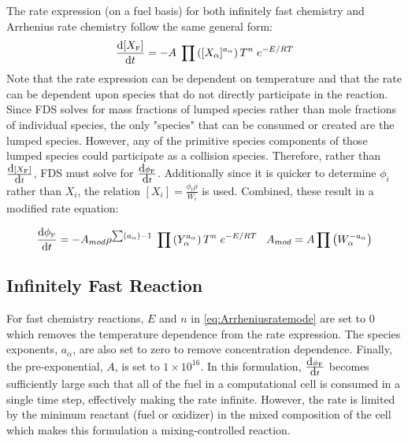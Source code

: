 \label{Reaction_Rate_Model}

The rate expression (on a fuel basis) for both infinitely fast chemistry and Arrhenius rate chemistry follow the same general form:
\begin{equation}\label{eq:Arrheniusrateeqn}
\frac{\mbox{d}[X_{\tiny \hbox{F}}]}{\mbox{d}t} = -A \; \prod \left([X_{\alpha}]^{a_{\alpha}} \right) T^n \; e^{-E/RT} 
\end{equation}
Note that the rate expression can be dependent on temperature and that the rate can be dependent upon species that do not directly participate in the reaction. Since FDS solves for mass fractions of lumped species rather than mole fractions of individual species, the only "species" that can be consumed or created are the lumped species.  However, any of the primitive species components of those lumped species could participate as a collision species.  Therefore, rather than $\frac{\mbox{d}[X_{\tiny \hbox{F}}]}{\mbox{d}t}$,  FDS must solve for $\frac{\mbox{d}\phi_{\tiny \hbox{F}}}{\mbox{d}t}$.  Additionally since it is quicker to determine $\phi_i$ rather than $X_i$, the relation $[X_i]=\frac{\phi_i \rho}{W_i}$ is used.  Combined, these result in a modified rate equation:

\begin{equation}\label{eq:Arrheniusratemode}
\frac{\mbox{d}\phi_{\tiny \hbox{F}}}{\mbox{d}t} = -A_{mod} \rho^{\sum (a_{\alpha}) -1} \; \prod \left(Y_{\alpha}^{a_{\alpha}} \right) T^n \; e^{-E/RT} \;\;\; A_{mod} = A \prod \left(W_{\alpha}^{-a_{\alpha}} \right)  
\end{equation}

\subsection{Infinitely Fast Reaction}
For fast chemistry reactions, $E$ and $n$ in \ref{eq:Arrheniusratemode} are set to $0$ which removes the temperature dependence from the rate expression. The species exponents, $a_{\alpha}$, are also set to zero to remove concentration dependence. Finally, the pre-exponential, $A$, is set to $1 \times 10^{16}$. In this formulation, $\frac{\mbox{d}\phi_{\tiny \hbox{F}}}{\mbox{d}t}$ becomes sufficiently large such that all of the fuel in a computational cell is consumed in a single time step, effectively making the rate infinite. However, the rate is limited by the minimum reactant (fuel or oxidizer) in the mixed composition of the cell which makes this formulation a mixing-controlled reaction.   

